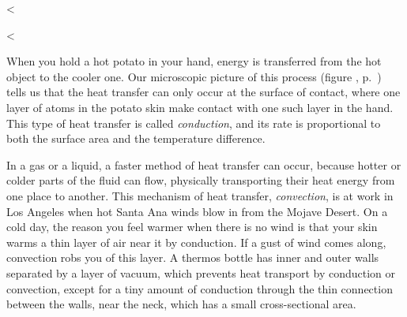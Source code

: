 <%

<%

When you hold a hot potato in your hand, energy is transferred from the hot object to
the cooler one. Our microscopic picture of this process (figure , p.~\pageref{fig:random-motion})
tells us that the heat transfer can only occur at the surface of contact, where one layer of atoms in the
potato skin make contact with one such layer in the hand. This type of heat transfer is called
\emph{conduction},
and its rate is proportional to both the surface area and the temperature difference.

In a gas or a liquid, a faster method of heat transfer can occur, because hotter or colder parts
of the fluid can flow, physically transporting their heat energy from one place to another. This
mechanism of heat transfer, \emph{convection},
is at work in Los Angeles when hot Santa Ana winds blow in from the Mojave Desert. On a cold day,
the reason you feel warmer when there is no wind is that your skin warms a thin layer of air near
it by conduction. If a gust of wind comes along, convection robs you of this layer.
A thermos bottle has inner and outer walls separated by a layer of vacuum, which prevents heat transport
by conduction or convection, except for a tiny amount of conduction through the thin connection between the walls, near the neck, which has
a small cross-sectional area.

